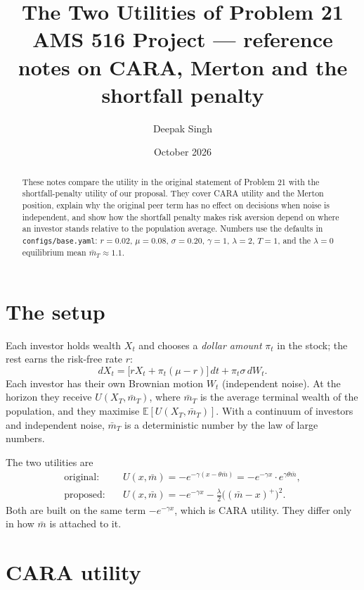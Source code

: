 \documentclass[11pt]{article}
\title{\textbf{The Two Utilities of Problem 21}\\[4pt]
\large AMS 516 Project --- reference notes on CARA, Merton and the shortfall penalty}
\author{Deepak Singh}
\date{October 2026}
\newcommand{\E}{\mathbb{E}}
\newcommand{\mb}{\bar m}
\begin{document}
\maketitle

\begin{abstract}
These notes compare the utility in the original statement of Problem 21 with the
shortfall-penalty utility of our proposal. They cover CARA utility and the Merton
position, explain why the original peer term has no effect on decisions when noise is
independent, and show how the shortfall penalty makes risk aversion depend on where an
investor stands relative to the population average. Numbers use the defaults in
\texttt{configs/base.yaml}: $r=0.02$, $\mu=0.08$, $\sigma=0.20$, $\gamma=1$, $\lambda=2$,
$T=1$, and the $\lambda=0$ equilibrium mean $\mb_T\approx1.1$.
\end{abstract}

\setcounter{tocdepth}{1}
\tableofcontents

\section{The setup}

Each investor holds wealth $X_t$ and chooses a \emph{dollar amount} $\pi_t$ in the
stock; the rest earns the risk-free rate $r$:
\[
  dX_t = \bigl[rX_t + \pi_t(\mu-r)\bigr]\,dt + \pi_t\sigma\,dW_t .
\]
Each investor has their own Brownian motion $W_t$ (independent noise). At the horizon they
receive $U(X_T,\mb_T)$, where $\mb_T$ is the average terminal wealth of the population,
and they maximise $\E[U(X_T,\mb_T)]$. With a continuum of investors and independent noise,
$\mb_T$ is a deterministic number by the law of large numbers.

The two utilities are
\begin{align*}
  \text{original:}\quad & U(x,\mb) = -e^{-\gamma(x-\theta\mb)}
     = -e^{-\gamma x}\cdot e^{\gamma\theta\mb}, \\
  \text{proposed:}\quad & U(x,\mb) = -e^{-\gamma x}
     - \tfrac{\lambda}{2}\bigl((\mb-x)^+\bigr)^2 .
\end{align*}
Both are built on the same term $-e^{-\gamma x}$, which is CARA utility. They differ only
in how $\mb$ is attached to it.

\section{CARA utility}
\end{document}
